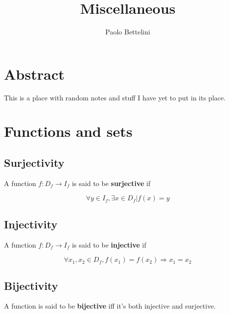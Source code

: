 \documentclass{article}
\title{Miscellaneous}
\author{Paolo Bettelini}
\date{}
\begin{document}
\maketitle
\tableofcontents
\pagebreak

\section{Abstract}

This is a place with random notes and stuff I have yet to put
in its place.

\section{Functions and sets}

\subsection{Surjectivity}

A function \(f:D_f \to I_f\) is said to be \textbf{surjective} if

\[
    \forall y \in I_f, \exists x \in D_f | f(x) = y
\]

\subsection{Injectivity}

A function \(f:D_f \to I_f\) is said to be \textbf{injective} if

\[
    \forall x_1, x_2 \in D_f, f(x_1) = f(x_2) \Rightarrow x_1 = x_2 
\]

\subsection{Bijectivity}

A function is said to be \textbf{bijective} iff it's both injective
and surjective.

\pagebreak
\end{document}
